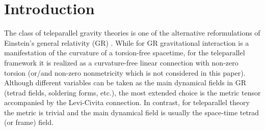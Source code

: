 \documentclass[
10pt, %
a4paper, %
oneside, %
twocolumn,
headinclude,footinclude, %
BCOR5mm, %
]{scrartcl}
\newcommand{\ho}[1]{\textcolor{magenta}{HO: #1}}
\begin{document}
	
	\setlength\parindent{10pt} %
	\setlength{\parskip}{5pt} %
	
	
	\section{Introduction}
	
	The class of teleparallel gravity theories is one of the alternative
	reformulations of Einstein's general relativity (GR)
	\cite{Hehl1976,AldrovandiPereiraBook,Cai2016}. While for GR gravitational
	interaction is a manifestation of the curvature of a torsion-free spacetime,
	for the teleparallel framework it is realized as a curvature-free linear
	connection with non-zero torsion (or/and non-zero nonmetricity which is not
	considered in this paper). Although different variables can be taken as the
	main dynamical fields in GR (tetrad fields, soldering forms, etc.), the most
	extended choice is the metric tensor accompanied by the Levi-Civita
	connection. In contrast, for teleparallel theory the metric is trivial and
	the main dynamical field is usually the space-time tetrad (or frame) field.
	
\end{document}
